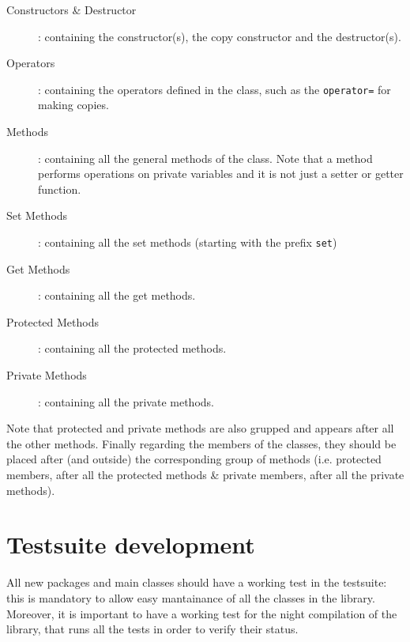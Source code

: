 \documentclass[10p]{article}
\begin{document}
\begin{enumerate}
\begin{description}
	  \item[Constructors \& Destructor]: containing the constructor(s), the copy constructor and the destructor(s).
      \item[Operators]: containing the operators defined in the class, such as the \texttt{operator=} for making copies.
      \item[Methods]: containing all the general methods of the class. Note that a method performs operations on private variables and it is not just a setter or getter function.
      \item[Set Methods]: containing all the set methods (starting with the prefix \texttt{set})
      \item[Get Methods]: containing all the get methods.
      \item[Protected Methods]: containing all the protected methods.
      \item[Private Methods]: containing all the private methods.
  \end{description}
  Note that protected and private methods are also grupped and appears after all the other methods. Finally regarding the members of the classes, they should be placed after (and outside) the corresponding group of methods (i.e. protected members, after all the protected methods \& private members, after all the private methods).
\end{enumerate}

\section{Testsuite development} \label{testsuite}
All new packages and main classes should have a working test in the testsuite: this is mandatory to allow easy mantainance of all the classes in the library. Moreover, it is important to have a working test for the night compilation of the library, that runs all the tests in order to verify their status.
\end{document}
